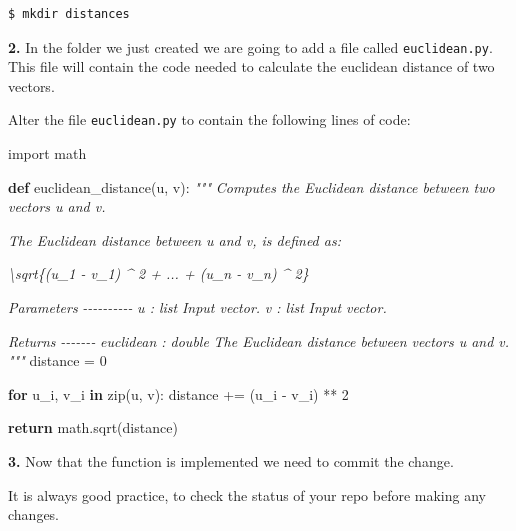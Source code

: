 \documentclass[11pt]{article}
\newenvironment{Shaded}{}{}
\newcommand{\KeywordTok}[1]{\textcolor[rgb]{0.00,0.44,0.13}{\textbf{{#1}}}}
\newcommand{\DecValTok}[1]{\textcolor[rgb]{0.25,0.63,0.44}{{#1}}}
\newcommand{\CommentTok}[1]{\textcolor[rgb]{0.38,0.63,0.69}{\textit{{#1}}}}
\newcommand{\NormalTok}[1]{{#1}}
\newcommand{\ImportTok}[1]{{#1}}
\newcommand{\ControlFlowTok}[1]{\textcolor[rgb]{0.00,0.44,0.13}{\textbf{{#1}}}}
\newcommand{\OperatorTok}[1]{\textcolor[rgb]{0.40,0.40,0.40}{{#1}}}
\newcommand{\BuiltInTok}[1]{{#1}}
\begin{document}
\begin{verbatim}
$ mkdir distances
\end{verbatim}

\textbf{2.} In the folder we just created we are going to add a file
called \texttt{euclidean.py}. This file will contain the code needed to
calculate the euclidean distance of two vectors.

Alter the file \texttt{euclidean.py} to contain the following lines of
code:

\begin{Shaded}
\begin{Highlighting}[]
\ImportTok{import}\NormalTok{ math }

\KeywordTok{def}\NormalTok{ euclidean\_distance(u, v):}
    \CommentTok{"""}
\CommentTok{    Computes the Euclidean distance between two vectors \textasciigrave{}u\textasciigrave{} and \textasciigrave{}v\textasciigrave{}.}

\CommentTok{    The Euclidean distance between \textasciigrave{}u\textasciigrave{} and \textasciigrave{}v\textasciigrave{}, is defined as:}

\CommentTok{    \textbackslash{}sqrt\{(u\_1 {-} v\_1) \^{} 2 + ... + (u\_n {-} v\_n) \^{} 2\}}

\CommentTok{    Parameters}
\CommentTok{    {-}{-}{-}{-}{-}{-}{-}{-}{-}{-}}
\CommentTok{    u : list}
\CommentTok{        Input vector.}
\CommentTok{    v : list}
\CommentTok{        Input vector.}

\CommentTok{    Returns}
\CommentTok{    {-}{-}{-}{-}{-}{-}{-}}
\CommentTok{    euclidean : double}
\CommentTok{        The Euclidean distance between vectors \textasciigrave{}u\textasciigrave{} and \textasciigrave{}v\textasciigrave{}.}
\CommentTok{    """}
\NormalTok{    distance }\OperatorTok{=} \DecValTok{0}
    
    \ControlFlowTok{for}\NormalTok{ u\_i, v\_i }\KeywordTok{in} \BuiltInTok{zip}\NormalTok{(u, v):}
\NormalTok{        distance }\OperatorTok{+=}\NormalTok{ (u\_i }\OperatorTok{{-}}\NormalTok{ v\_i) }\OperatorTok{**} \DecValTok{2}
        
    \ControlFlowTok{return}\NormalTok{ math.sqrt(distance)}
\end{Highlighting}
\end{Shaded}

\textbf{3.} Now that the function is implemented we need to commit the
change.

It is always good practice, to check the status of your repo before
making any changes.
\end{document}
